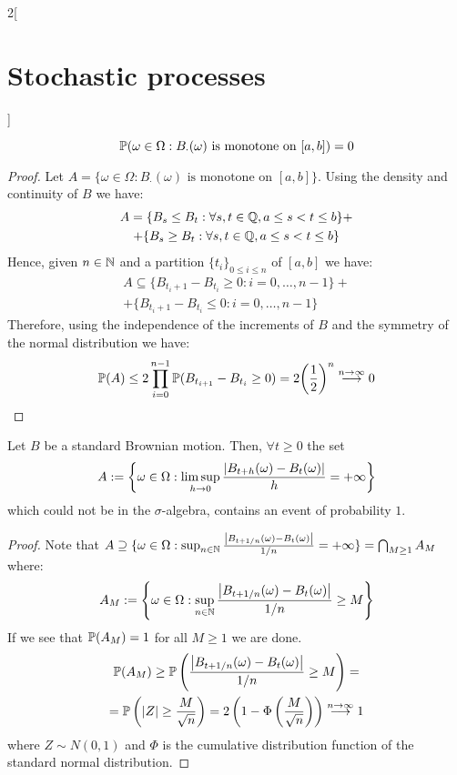\documentclass[../../../main_math.tex]{subfiles}
\begin{document}
\begin{multicols}{2}[\section{Stochastic processes}]
\begin{proposition}
    $$
      \mathbb{P}(\omega\in \Omega:B_\cdot(\omega)\text{ is monotone on }[a,b])=0
    $$
  \end{proposition}
  \begin{proof}
    Let $A=\{\omega\in\Omega:B_\cdot(\omega)\text{ is monotone on }[a,b]\}$. Using the density and continuity of $B$ we have:
    \begin{multline*}
      A=\{B_s\leq B_t:\forall s,t \in\mathbb{Q}, a\leq s< t\leq b\}+  \\+ \{B_s\geq B_t:\forall s,t \in\mathbb{Q}, a\leq s< t\leq b\}
    \end{multline*}
    Hence, given $n\in\mathbb{N}$ and a partition ${\{t_i\}}_{0\leq i\leq n}$ of $[a,b]$ we have:
    \begin{multline*}
      A\subseteq \{ B_{t_i+1} - B_{t_i}\geq 0: i=0,\ldots,n-1\}+ \\ + \{ B_{t_i+1} - B_{t_i}\leq 0: i=0,\ldots,n-1\}
    \end{multline*}
    Therefore, using the independence of the increments of $B$ and the symmetry of the normal distribution we have:
    $$
      \mathbb{P}(A)\leq 2\prod_{i=0}^{n-1} \mathbb{P}(B_{t_{i+1}}-B_{t_i}\geq 0)=2{\left(\frac{1}{2}\right)}^n\overset{n\to \infty}{\longrightarrow} 0
    $$
  \end{proof}
  \begin{proposition}
    Let $B$ be a standard Brownian motion. Then, $\forall t\geq 0$ the set
    $$
      A:=\left\{\omega\in\Omega:\limsup_{h\to 0}\frac{\abs{B_{t+h}(\omega)-B_t(\omega)}}{h}=+\infty\right\}
    $$
    which could not be in the $\sigma$-algebra, contains an event of probability $1$.
  \end{proposition}
  \begin{proof}
    Note that $A\supseteq \{\omega\in\Omega:\sup_{n\in\mathbb{N}}\frac{\abs{B_{t+1/n}(\omega)-B_t(\omega)}}{1/n}=+\infty\}=\bigcap_{M\geq 1} A_{M}$ where:
    $$
      A_M:=\left\{\omega\in\Omega:\sup_{n\in\mathbb{N}}\frac{\abs{B_{t+1/n}(\omega)-B_t(\omega)}}{1/n}\geq M\right\}
    $$
    If we see that $\mathbb{P}(A_M)=1$ for all $M\geq 1$ we are done.
    \begin{multline*}
      \mathbb{P}(A_M)\geq \mathbb{P} \left(\frac{\abs{B_{t+1/n}(\omega)-B_t(\omega)}}{1/n}\geq M\right) = \\ = \mathbb{P}\left(\abs{Z}\geq \frac{M}{\sqrt{n}}\right)=2 \left(1-\Phi\left(\frac{M}{\sqrt{n}}\right)\right)\overset{n\to\infty}{\longrightarrow} 1
    \end{multline*}
    where $Z\sim N(0,1)$ and $\Phi$ is the cumulative distribution function of the standard normal distribution. 

\end{proof}
\end{multicols}
\end{document}
